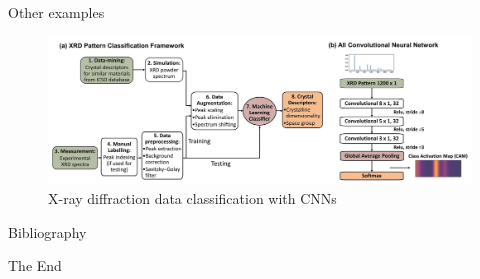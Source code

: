 \documentclass[aspectratio=169]{beamer}
\begin{document}
\begin{frame}{Other examples}
        \begin{figure}
        \centering
        \includegraphics[width=\textwidth]{lectures/slides_tex/figures/xrdclassification.png}
        \caption{X-ray diffraction data classification with CNNs\cite{oviedoFastInterpretableClassification2019}}
    \end{figure}
\end{frame}

\begin{frame}[allowframebreaks]{Bibliography}
    
    
\end{frame}


\begin{frame}
    \Huge{\centerline{The End}}
\end{frame}
\end{document}
